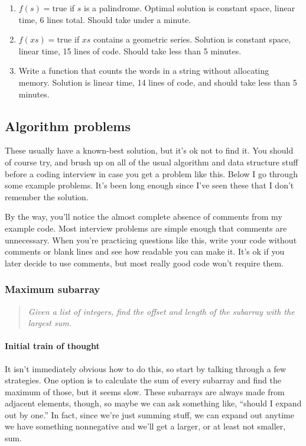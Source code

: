 \documentclass{article}
\begin{document}
\begin{enumerate}
\item{$f(s) = \textrm{true}$ if $s$ is a palindrome. Optimal solution}
  is constant space, linear time, 6 lines total. Should take under a
  minute.
\item{$f(xs) = \textrm{true}$ if $xs$ contains a geometric series.}
  Solution is constant space, linear time, 15 lines of code. Should
  take less than 5 minutes.
\item{Write a function that counts the words in a string without}
  allocating memory. Solution is linear time, 14 lines of code, and
  should take less than 5 minutes.
\end{enumerate}

\subsection{Algorithm problems}
    These usually have a known-best solution, but it's ok not to find it. You
    should of course try, and brush up on all of the usual algorithm and data
    structure stuff before a coding interview in case you get a problem like
    this. Below I go through some example problems. It's been long enough since
    I've seen these that I don't remember the solution.

    By the way, you'll notice the almost complete absence of comments from my
    example code. Most interview problems are simple enough that comments are
    unnecessary. When you're practicing questions like this, write your code
    without comments or blank lines and see how readable you can make it. It's
    ok if you later decide to use comments, but most really good code won't
    require them.

\subsubsection{Maximum subarray}
\begin{quote}
\em
Given a list of integers, find the offset and length of the subarray
with the largest sum.
\end{quote}

\paragraph{Initial train of thought}
        It isn't immediately obvious how to do this, so start by talking
        through a few strategies. One option is to calculate the sum of every
        subarray and find the maximum of those, but it seems slow. These
        subarrays are always made from adjacent elements, though, so maybe we
        can ask something like, ``should I expand out by one.'' In fact, since
        we're just summing stuff, we can expand out anytime we have something
        nonnegative and we'll get a larger, or at least not smaller, sum.
\end{document}
